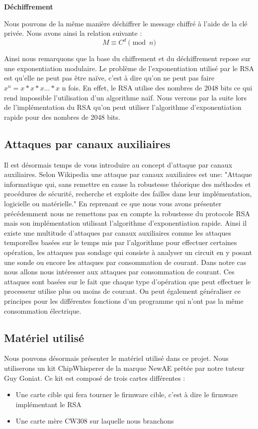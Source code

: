 \textbf{Déchiffrement}


Nous pouvons de la même manière déchiffrer le message chiffré à l'aide de la clé privée. 
Nous avons ainsi la relation suivante :
\begin{equation}
\label{eq:dechiffrement}

M \equiv C^d \pmod{n}

\end{equation}


Ainsi nous remarquons que la base du chiffrement et du déchiffrement repose sur une exponentiation modulaire. Le problème de l'exponentiation utilisé par le RSA est qu'elle ne peut pas être naïve, c'est à dire qu'on ne peut pas faire $ x^n = x*x*x...*x$ n fois. En effet, le RSA utilise des nombres de 2048 bits ce qui rend impossible l'utilisation d'un algorithme naïf.
Nous verrons par la suite lors de l'implémentation du RSA qu'on peut utiliser l'algorithme d'exponentiation rapide pour des nombres de 2048 bits.
\newpage
\subsection{Attaques par canaux auxiliaires}
Il est désormais temps de vous introduire au concept d'attaque par canaux auxiliaires.
Selon Wikipedia une attaque par canaux auxiliaires est une:
"Attaque informatique qui, sans remettre en cause la robustesse théorique des méthodes et procédures de sécurité, recherche et exploite des failles dans leur implémentation, logicielle ou matérielle."
En reprenant ce que nous vous avons présenter précédemment nous ne remettons pas en compte la robustesse du protocole RSA mais son implémentation utilisant l'algorithme d’exponentiation rapide.
Ainsi il existe une multitude d'attaques par canaux auxiliaires comme les attaques temporelles basées sur le temps mis par l'algorithme pour effectuer certaines opération, les attaques pas sondage qui consiste à analyser un circuit en y posant une sonde ou encore les attaques par consommation de courant.
Dans notre cas nous allons nous intéresser aux attaques par consommation de courant. Ces attaques sont basées sur le fait que chaque type d'opération que peut effectuer le processeur utilise plus ou moins de courant. On peut également généraliser ce principes pour les différentes fonctions d'un programme qui n'ont pas la même consommation électrique.

\subsection{Matériel utilisé}
Nous pouvons désormais présenter le matériel utilisé dans ce projet. Nous utiliserons un kit ChipWhisperer de la marque NewAE prêtée par notre tuteur Guy Goniat. Ce kit est composé de trois cartes différentes :
\begin{itemize}
\item Une carte cible qui fera tourner le firmware cible, c'est à dire le firmware implémentant le RSA
\item Une carte mère CW308 sur laquelle nous branchons 

\end{itemize}

